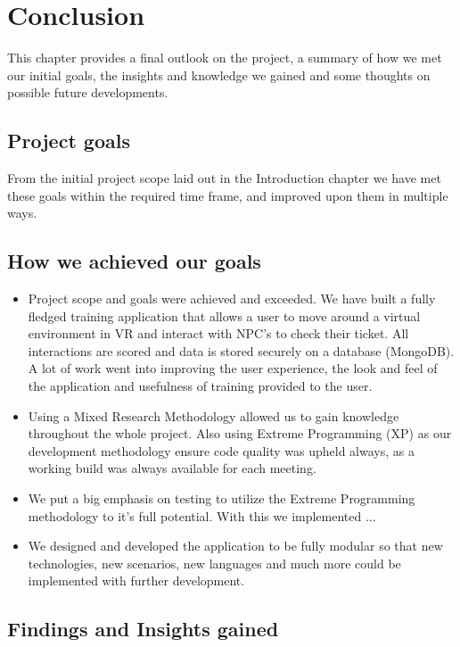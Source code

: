 \chapter{Conclusion}
This chapter provides a final outlook on the project, a summary of how we met our initial goals, the insights and knowledge we gained and some thoughts on possible future developments.

\section{Project goals}
From the initial project scope laid out in the Introduction chapter we have met these goals within the required time frame, and improved upon them in multiple ways.


\section{How we achieved our goals}
\begin{itemize}
    \item Project scope and goals were achieved and exceeded. We have built a fully fledged training application that allows a user to move around a virtual environment in VR and interact with NPC's to check their ticket. All interactions are scored and data is stored securely on a database (MongoDB). A lot of work went into improving the user experience, the look and feel of the application and usefulness of training provided to the user. 

    \item Using a Mixed Research Methodology allowed us to gain knowledge throughout the whole project. Also using Extreme Programming (XP) as our development methodology ensure code quality was upheld always, as a working build was always available for each meeting.
    
    \item We put a big emphasis on testing to utilize the Extreme Programming methodology to it's full potential. With this we implemented ... %
    
    \item We designed and developed the application to be fully modular so that new technologies, new scenarios, new languages and much more could be implemented with further development.

\end{itemize}


\section{Findings and Insights gained}

